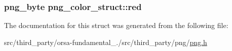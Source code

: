\subsubsection[{red}]{\setlength{\rightskip}{0pt plus 5cm}png\+\_\+byte png\+\_\+color\+\_\+struct\+::red}\label{structpng__color__struct_ad39dc2d7cb82e3670a3ad397bb4083cb}


The documentation for this struct was generated from the following file\+:\begin{DoxyCompactItemize}
\item 
src/third\+\_\+party/orsa-\/fundamental\+\_./src/third\+\_\+party/png/\hyperlink{png_8h}{png.\+h}\end{DoxyCompactItemize}
